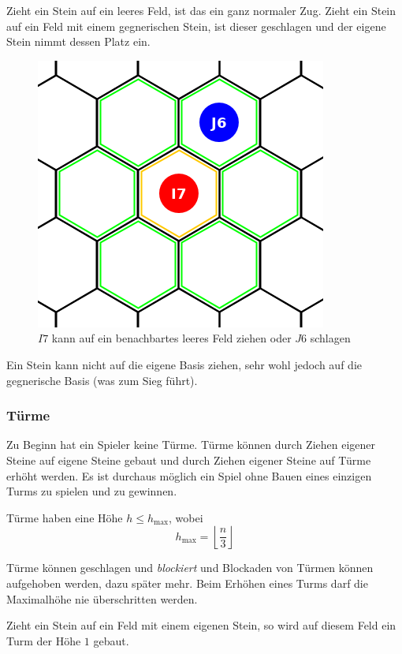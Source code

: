Zieht ein Stein auf ein leeres Feld, ist das ein ganz normaler Zug. Zieht ein Stein auf ein Feld mit einem gegnerischen Stein, ist dieser geschlagen und der eigene Stein nimmt dessen Platz ein.
\begin{figure}[ht]
\begin{center}
\includegraphics[scale=0.25]{graphic/token-move-kick.png}
\end{center}
\caption*{$I7$ kann auf ein benachbartes leeres Feld ziehen oder $J6$ schlagen}
\end{figure}

Ein Stein kann nicht auf die eigene Basis ziehen, sehr wohl jedoch auf die gegnerische Basis (was zum Sieg führt).
\newpage

\subsubsection*{Türme}
Zu Beginn hat ein Spieler keine Türme. Türme können durch Ziehen eigener Steine auf eigene Steine gebaut und durch Ziehen eigener Steine auf Türme erhöht werden. Es ist durchaus möglich ein Spiel ohne Bauen eines einzigen Turms zu spielen und zu gewinnen.

Türme haben eine Höhe $h \le h_\text{max}$, wobei \[h_\text{max} = \left\lfloor \frac{n}{3}\right\rfloor\]

Türme können geschlagen und \emph{blockiert} und Blockaden von Türmen können aufgehoben werden, dazu  später mehr. Beim Erhöhen eines Turms darf die Maximalhöhe nie überschritten werden.

\bigskip

Zieht ein Stein auf ein Feld mit einem eigenen Stein, so wird auf diesem Feld ein Turm der Höhe $1$ gebaut.

